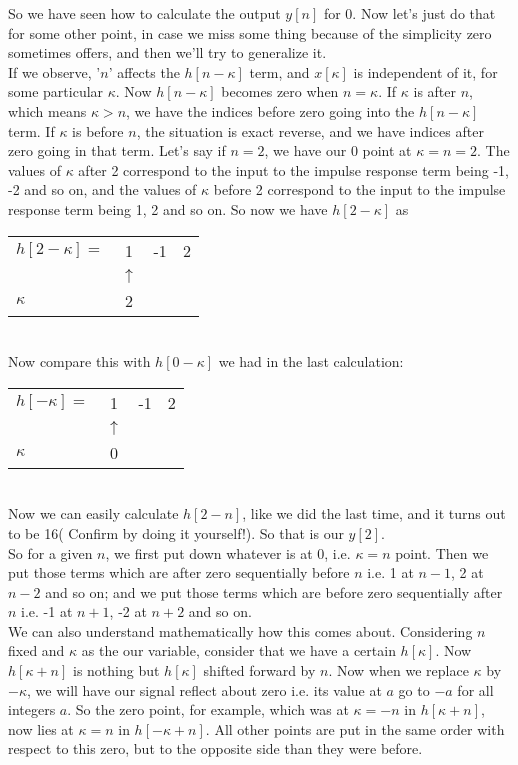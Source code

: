 So we have seen how to calculate the output $y[n]$ for 0. Now let's just do that for some other point, in case we miss some thing because of the simplicity zero sometimes offers, and then we'll try to generalize it.\\
If we observe, '$n$' affects the $h[n-\kappa]$ term, and $x[\kappa]$ is independent of it, for some particular $\kappa$. Now $h[n-\kappa]$ becomes zero when $n=\kappa$. If $\kappa$ is after $n$, which means $\kappa>n$, we have the indices before zero going into the $h[n-\kappa]$ term. If $\kappa$ is before $n$, the situation is exact reverse, and we have indices after zero going in that term. Let's say if $n=2$, we have our 0 point at $\kappa=n=2$. The values of $\kappa$ after 2 correspond to the input to the impulse response term being -1, -2 and so on, and the values of $\kappa$ before 2 correspond to the input to the impulse response term being 1, 2 and so on. So now we have $h[2-\kappa]$ as\\
\begin{tabular}{ l  c r r  }
  $h[2-\kappa] =$ & 1 & -1 & 2\\
     & $\uparrow$ &  & \\
   $\kappa$  & 2 &  & \\
\end{tabular}\\
Now compare this with $h[0-\kappa]$ we had in the last calculation:\\
\begin{tabular}{ l  c r r  }
  $h[-\kappa] =$ & 1 & -1 & 2\\
     & $\uparrow$ &  & \\
   $\kappa$  & 0 &  & \\
\end{tabular}\\
Now we can easily calculate $h[2-n]$, like we did the last time, and it turns out to be 16( Confirm by doing it yourself!). So that is our $y[2]$.\\
So for a given $n$, we first put down whatever is at 0, i.e. $\kappa=n$ point. Then we put those terms which are after zero sequentially before $n$ i.e. 1 at $n-1$, 2 at $n-2$ and so on; and  we put those terms which are before zero sequentially after $n$ i.e. -1 at $n+1$, -2 at $n+2$ and so on.\\
We can also understand mathematically how this comes about. Considering $n$ fixed and $\kappa$ as the our variable, consider that we have a certain $h[\kappa]$. Now $h[\kappa+n]$ is nothing but $h[\kappa]$ shifted forward by $n$. Now when we replace $\kappa$ by $-\kappa$, we will have our signal reflect about zero i.e. its value at $a$ go to $-a$ for all integers $a$. So the zero point, for example, which was at $\kappa=-n$ in $h[\kappa+n]$, now lies at $\kappa=n$ in $h[-\kappa+n]$. All other points are put in the same order with respect to this zero, but to the opposite side than they were before.


